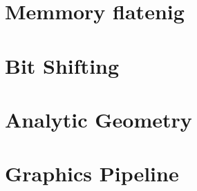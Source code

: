 \section{Memmory flatenig}
\section{Bit Shifting}
\section{Analytic Geometry}
\section{Graphics Pipeline}
